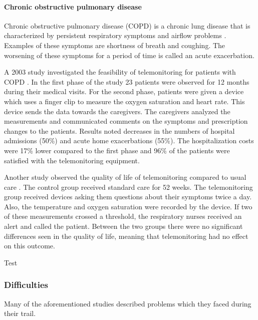         \paragraph{Chronic obstructive pulmonary disease} Chronic obstructive pulmonary disease (COPD) is a chronic lung disease that is characterized by persistent respiratory symptoms and airflow problems \cite{vogelmeier2017global}. Examples of these symptoms are shortness of breath and coughing. The worsening of these symptoms for a period of time is called an acute exacerbation.

        A 2003 study investigated the feasibility of telemonitoring for patients with COPD \cite{maiolo2003home}. In the first phase of the study 23 patients were observed for 12 months during their medical visits. For the second phase, patients were given a device which uses a finger clip to measure the oxygen saturation and heart rate. This device sends the data towards the caregivers. The caregivers analyzed the measurements and communicated comments on the symptoms and prescription changes to the patients. Results noted decreases in the numbers of hospital admissions (50\%) and acute home exacerbations (55\%). The hospitalization costs were 17\% lower compared to the first phase and 96\% of the patients were satisfied with the telemonitoring equipment.

        Another study observed the quality of life of telemonitoring compared to usual care \cite{lewis2010home}. The control group received standard care for 52 weeks. The telemonitoring group received devices asking them questions about their symptoms twice a day. Also, the temperature and oxygen saturation were recorded by the device. If two of these measurements crossed a threshold, the respiratory nurses received an alert and called the patient. Between the two groups there were no significant differences seen in the quality of life, meaning that telemonitoring had no effect on this outcome.




        \noindent Test


        \subsubsection{Difficulties}

        Many of the aforementioned studies described problems which they faced during their trail.

